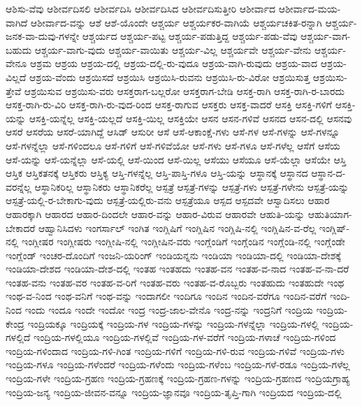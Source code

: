 {ಆಶಿಸು-ವೆವು
ಆಶೀರ್ವದಿಸಲಿ
ಆಶೀರ್ವದಿಸಿ
ಆಶೀರ್ವದಿಸಿದ
ಆಶೀರ್ವದಿಸುತ್ತೀರಿ
ಆಶೀರ್ವಾದ
ಆಶೀರ್ವಾದ-ಮಯ-ವಾಗಿದೆ
ಆಶೀರ್ವಾದ-ವನ್ನು
ಆಶೆ
ಆಶೆ-ಯೊಂದೇ
ಆಶ್ಚರ್ಯ
ಆಶ್ಚರ್ಯಕರ-ವಾಗಿಯೆ
ಆಶ್ಚರ್ಯಚಕಿತ-ರನ್ನಾಗಿ
ಆಶ್ಚರ್ಯ-ಜನಕ-ವಾ-ದುವು-ಗಳನ್ನೇ
ಆಶ್ಚರ್ಯದ
ಆಶ್ಚರ್ಯ-ಪಟ್ಟ
ಆಶ್ಚರ್ಯ-ಪಡುತ್ತಿದ್ದ
ಆಶ್ಚರ್ಯ-ಪಡು-ವೆವು
ಆಶ್ಚರ್ಯ-ವಾಗ-ಬಹುದು
ಆಶ್ಚರ್ಯ-ವಾಗು-ವುದು
ಆಶ್ಚರ್ಯ-ವಾಯಿತು
ಆಶ್ಚರ್ಯ-ವಿಲ್ಲ
ಆಶ್ಚರ್ಯವೇ
ಆಶ್ಚರ್ಯ-ವೇನು
ಆಶ್ಚರ್ಯ-ವೇನೂ
ಆಶ್ರಮ
ಆಶ್ರಯ
ಆಶ್ರಯ-ದಲ್ಲಿ
ಆಶ್ರಯ-ದಲ್ಲಿ-ರು-ವುದೂ
ಆಶ್ರಯ-ವಾಗಿ-ರುವುದು
ಆಶ್ರಯ-ವಾದ
ಆಶ್ರಯ-ವಿಲ್ಲದೆ
ಆಶ್ರಯ-ವೆಂದು
ಆಶ್ರಯಿಸದೆ
ಆಶ್ರಯಿಸಿ
ಆಶ್ರಯಿಸಿ-ರುವನು
ಆಶ್ರಯಿಸಿ-ರು-ವಿರೋ
ಆಶ್ರಯಿಸುತ್ತ
ಆಶ್ರಯಿಸು-ತ್ತೇವೆ
ಆಶ್ರಯಿಸುವ
ಆಶ್ರಯಿಸು-ವರು
ಆಸಕ್ತರಾಗ-ಬಲ್ಲರೋ
ಆಸಕ್ತರಾಗ-ಬೇಡಿ
ಆಸಕ್ತ-ರಾಗಿ
ಆಸಕ್ತ-ರಾಗಿ-ರ-ಬಾರದು
ಆಸಕ್ತ-ರಾಗಿ-ರು-ವಿರಿ
ಆಸಕ್ತ-ರಾಗಿ-ರು-ವುದ-ರಿಂದ
ಆಸಕ್ತ-ರಾಗುವ
ಆಸಕ್ತರು
ಆಸಕ್ತ-ವಾದರೆ
ಆಸಕ್ತಿ
ಆಸಕ್ತಿ-ಗಳಿಗೆ
ಆಸಕ್ತಿ-ಯನ್ನು
ಆಸಕ್ತಿ-ಯನ್ನೆಲ್ಲ
ಆಸಕ್ತಿ-ಯಲ್ಲದೆ
ಆಸಕ್ತಿ-ಯಿಲ್ಲ
ಆಸಕ್ತಿಯೇ
ಆಸನ
ಆಸನ-ಗಳಿವೆ
ಆಸನದ
ಆಸನ-ದಲ್ಲಿ
ಆಸನವು
ಆಸರೆ
ಆಸರೆಯ
ಆಸರೆ-ಯಾಗಿದ್ದೆ
ಆಸಿಡ್
ಆಸುರೀ
ಆಸೆ
ಆಸೆ-ಆಕಾಂಕ್ಷೆ-ಗಳು
ಆಸೆ-ಗಳ
ಆಸೆ-ಗಳನ್ನು
ಆಸೆ-ಗಳನ್ನೂ
ಆಸೆ-ಗಳನ್ನೆಲ್ಲಾ
ಆಸೆ-ಗಳಿಂದಲೂ
ಆಸೆ-ಗಳಿಗೆ
ಆಸೆ-ಗಳಿವೆಯೋ
ಆಸೆ-ಗಳು
ಆಸೆ-ಗಳೂ
ಆಸೆ-ಗಳೆಲ್ಲ
ಆಸೆಗೆ
ಆಸೆಯ
ಆಸೆ-ಯನ್ನು
ಆಸೆ-ಯನ್ನೆಲ್ಲಾ
ಆಸೆ-ಯಲ್ಲಿ
ಆಸೆ-ಯಿಂದ
ಆಸೆ-ಯಿಲ್ಲ
ಆಸೆಯು
ಆಸೆಯೂ
ಆಸೆ-ಯೆಲ್ಲಾ
ಆಸೆಯೇ
ಆಸ್ತಿ
ಆಸ್ತಿಕ
ಆಸ್ತಿಕತನಕ್ಕೆ
ಆಸ್ತಿಕರು
ಆಸ್ತಿಕ್ಯ
ಆಸ್ತಿ-ಗಳನ್ನೆಲ್ಲ
ಆಸ್ತಿ-ಪಾಸ್ತಿ-ಗಳೂ
ಆಸ್ತಿ-ಯನ್ನು
ಆಸ್ಥಾನಕ್ಕೆ
ಆಸ್ಥಾನದ
ಆಸ್ಥಾನ-ದ-ವರನ್ನೆಲ್ಲ
ಆಸ್ಥಾನಿಕರಿಲ್ಲ
ಆಸ್ಥಾನಿಕರು
ಆಸ್ಥಾನಿಕರೆಲ್ಲ
ಆಸ್ಪತ್ರೆ
ಆಸ್ಪತ್ರೆ-ಗಳನ್ನು
ಆಸ್ಪತ್ರೆ-ಗಳು
ಆಸ್ಪತ್ರೆ-ಗಳೇನು
ಆಸ್ಪತ್ರೆ-ಯನ್ನು
ಆಸ್ಪತ್ರೆ-ಯಲ್ಲಿ-ರ-ಬೇಕಾಗು-ವುದು
ಆಸ್ಪತ್ರೆ-ಯಲ್ಲಿರು-ವನು
ಆಸ್ಪತ್ರೆಯೂ
ಆಸ್ಪದ
ಆಸ್ಪದವೇ
ಆಸ್ವಾದಿಸಲು
ಆಹಾರ
ಆಹಾರಕ್ಕಾಗಿ
ಆಹಾರದ
ಆಹಾರ-ದಿಂದಲೇ
ಆಹಾರ-ವನ್ನು
ಆಹಾರ-ವಿರುವ
ಆಹಾರವೇ
ಆಹುತಿ-ಯನ್ನು
ಆಹುತಿಯಾಗ-ಬೇಕಾದರೆ
ಆಹ್ವಾನಿಸಿದಳು
ಇಂಗರ್ಸಾಲ್
ಇಂಗಿತ
ಇಂಗ್ಲಿಷಿಗೆ
ಇಂಗ್ಲಿಷಿನ
ಇಂಗ್ಲಿಷಿ-ನಲ್ಲಿ
ಇಂಗ್ಲಿಷಿನ-ವ-ರೆಲ್ಲ
ಇಂಗ್ಲಿಷ್-ನಲ್ಲಿ
ಇಂಗ್ಲೀಷರ
ಇಂಗ್ಲೀಷರು
ಇಂಗ್ಲೀಷಿ-ನಲ್ಲಿ
ಇಂಗ್ಲೀಷಿನ-ವರು
ಇಂಗ್ಲೆಂಡಿಗೆ
ಇಂಗ್ಲೆಂಡಿನ
ಇಂಗ್ಲೆಂಡಿ-ನಲ್ಲಿ
ಇಂಗ್ಲೆಂಡೇ
ಇಂಗ್ಲೆಂಡ್
ಇಂಚರ-ದೊಂದಿಗೆ
ಇಂಜನಿ-ಯರಿಂಗ್
ಇಂಡಿಯನ್ನನು
ಇಂಡಿಯಾ
ಇಂಡಿಯಾ-ದಲ್ಲಿ
ಇಂಡಿಯಾ-ದೇಶಕ್ಕೆ
ಇಂಡಿಯಾ-ದೇಶದ
ಇಂಡಿಯಾ-ದೇಶ-ದಲ್ಲಿ
ಇಂತಹ
ಇಂತಹದು
ಇಂತಹ-ವನ
ಇಂತಹ-ವ-ನಾದ
ಇಂತಹ-ವ-ನಾ-ದರೆ
ಇಂತಹ-ವನು
ಇಂತಹ-ವರ
ಇಂತಹ-ವ-ರಿಗೆ
ಇಂತಹ-ವರು
ಇಂತಹ-ವ-ರೊಬ್ಬರು
ಇಂತಹುದು
ಇಂತಹುದೇ
ಇಂಥ
ಇಂಥ-ವ-ನಿಂದ
ಇಂಥ-ವನಿಗೆ
ಇಂಥ-ವನ್ನು
ಇಂದಾಗಲೀ
ಇಂದಿಗೂ
ಇಂದಿನ
ಇಂದಿನ-ವರೆಗೂ
ಇಂದಿನ-ವರೆಗೆ
ಇಂದಿ-ನಿಂದ
ಇಂದು
ಇಂದೂ
ಇಂದೇ
ಇಂದೋ
ಇಂದ್ರ
ಇಂದ್ರ-ಜಾಲ-ವೇನೊ
ಇಂದ್ರ-ನನ್ನು
ಇಂದ್ರನಿಗೆ
ಇಂದ್ರಿಯ
ಇಂದ್ರಿಯ-ಕೇಂದ್ರ
ಇಂದ್ರಿಯಕ್ಕೂ
ಇಂದ್ರಿಯಕ್ಕೆ
ಇಂದ್ರಿಯ-ಗಳ
ಇಂದ್ರಿಯ-ಗಳನ್ನು
ಇಂದ್ರಿಯ-ಗಳನ್ನೆಲ್ಲಾ
ಇಂದ್ರಿಯ-ಗಳಲ್ಲಿ
ಇಂದ್ರಿಯ-ಗಳಲ್ಲಿದೆ
ಇಂದ್ರಿಯ-ಗಳಲ್ಲಿಯೂ
ಇಂದ್ರಿಯ-ಗಳಲ್ಲಿವೆ
ಇಂದ್ರಿಯ-ಗಳ-ವರೆಗೆ
ಇಂದ್ರಿಯ-ಗಳಾಚೆ
ಇಂದ್ರಿಯ-ಗಳಿಂದ
ಇಂದ್ರಿಯ-ಗಳಿಂದಾದ
ಇಂದ್ರಿಯ-ಗಳಿ-ಗಿಂತ
ಇಂದ್ರಿಯ-ಗಳಿಗೆ
ಇಂದ್ರಿಯ-ಗಳಿ-ರುವ
ಇಂದ್ರಿಯ-ಗಳಿವೆ
ಇಂದ್ರಿಯ-ಗಳು
ಇಂದ್ರಿಯ-ಗಳೂ
ಇಂದ್ರಿಯ-ಗಳೆಂದರೆ
ಇಂದ್ರಿಯ-ಗಳೆಂದು
ಇಂದ್ರಿಯ-ಗಳೆಂಬ
ಇಂದ್ರಿಯ-ಗಳೆ-ರಡೂ
ಇಂದ್ರಿಯ-ಗಳೆಲ್ಲ
ಇಂದ್ರಿಯ-ಗಳೇ
ಇಂದ್ರಿಯ-ಗ್ರಹಣ
ಇಂದ್ರಿಯ-ಗ್ರಹಣಕ್ಕೆ
ಇಂದ್ರಿಯ-ಗ್ರಹಣ-ಗಳನ್ನು
ಇಂದ್ರಿಯ-ಗ್ರಹಣದ
ಇಂದ್ರಿಯಗ್ರಾಹ್ಯ
ಇಂದ್ರಿಯ-ಜನ್ಯ
ಇಂದ್ರಿಯ-ಜೀವನ-ವನ್ನೂ
ಇಂದ್ರಿಯ-ಜ್ಞಾನವೂ
ಇಂದ್ರಿಯ-ತೃಪ್ತಿ-ಗಾಗಿ
ಇಂದ್ರಿಯದ
ಇಂದ್ರಿಯ-ದಲ್ಲಿ
}

